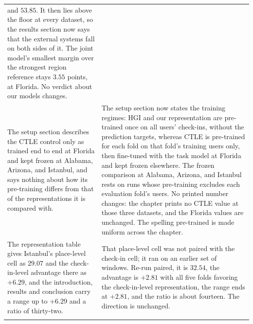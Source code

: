 \begin{table}[htb]
\begin{tabular}{@{}p{}p{}@{}}
and $53.85$. It then lies above the floor at every dataset, so
the results section now says that the external systems fall on
both sides of it. The joint model's smallest margin over the
strongest region reference stays $3.55$ points, at Florida. No
verdict about our models changes. \\
\addlinespace
The setup section describes the CTLE control only as trained
end to end at Florida and kept frozen at Alabama, Arizona, and
Istanbul, and says nothing about how its pre-training differs
from that of the representations it is compared with. &
The setup section now states the training regimes: HGI and
our representation are pre-trained once on all users' check-ins,
without the prediction targets, whereas CTLE is pre-trained for
each fold on that fold's training users only, then fine-tuned
with the task model at Florida and kept frozen elsewhere. The
frozen comparison at Alabama, Arizona, and Istanbul rests on
runs whose pre-training excludes each evaluation fold's users.
No printed number changes: the chapter prints no CTLE value at
those three datasets, and the Florida values are unchanged. The
spelling pre-trained is made uniform across the chapter. \\
\addlinespace
The representation table gives Istanbul's place-level cell as
$29.07$ and the check-in-level advantage there as $+6.29$, and
the introduction, results and conclusion carry a range up to
$+6.29$ and a ratio of thirty-two. &
That place-level cell was not paired with the check-in cell; it
ran on an earlier set of windows. Re-run paired, it is $32.54$,
the advantage is $+2.81$ with all five folds favoring the
check-in-level representation, the range ends at $+2.81$, and
the ratio is about fourteen. The direction is unchanged. \\
\addlinespace

\end{tabular}
\end{table}
